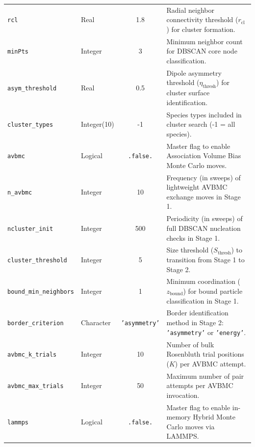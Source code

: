 \documentclass[final,5p,times,twocolumn]{elsarticle}
\begin{document}
\begin{table}[tbp]
\begin{tabularx}{\textwidth}{l l c X}
\texttt{rcl} & Real & 1.8 & Radial neighbor connectivity threshold ($r_{\text{cl}}$) for cluster formation. \\
\texttt{minPts} & Integer & 3 & Minimum neighbor count for DBSCAN core node classification. \\
\texttt{asym\_threshold}& Real & 0.5 & Dipole asymmetry threshold ($\eta_{\text{thresh}}$) for cluster surface identification. \\
\texttt{cluster\_types}& Integer(10) & -1 & Species types included in cluster search (-1 = all species). \\
\texttt{avbmc} & Logical & \texttt{.false.} & Master flag to enable Association Volume Bias Monte Carlo moves. \\
\texttt{n\_avbmc} & Integer & 10 & Frequency (in sweeps) of lightweight AVBMC exchange moves in Stage 1. \\
\texttt{ncluster\_init} & Integer & 500 & Periodicity (in sweeps) of full DBSCAN nucleation checks in Stage 1. \\
\texttt{cluster\_threshold}& Integer & 5 & Size threshold ($S_{\text{thresh}}$) to transition from Stage 1 to Stage 2. \\
\texttt{bound\_min\_neighbors}& Integer & 1 & Minimum coordination ($z_{\text{bound}}$) for bound particle classification in Stage 1. \\
\texttt{border\_criterion}& Character & \texttt{'asymmetry'}& Border identification method in Stage 2: \texttt{'asymmetry'} or \texttt{'energy'}. \\
\texttt{avbmc\_k\_trials}& Integer & 10 & Number of bulk Rosenbluth trial positions ($K$) per AVBMC attempt. \\
\texttt{avbmc\_max\_trials}& Integer & 50 & Maximum number of pair attempts per AVBMC invocation. \\
\texttt{lammps} & Logical & \texttt{.false.} & Master flag to enable in-memory Hybrid Monte Carlo moves via LAMMPS. \\
\bottomrule
\end{tabularx}
\end{table}
\end{document}
